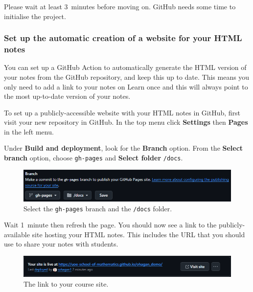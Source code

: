 Please wait at least 3~minutes before moving on. GitHub needs some time to initialise the project.

\subsubsection{Set up the automatic creation of a website for your HTML notes}

You can set up a GitHub Action to automatically generate the HTML version of your notes from the GitHub repository, and keep this up to date. This means you only need to add a link to your notes on Learn once and this will always point to the most up-to-date version of your notes.

To set up a publicly-accessible website with your HTML notes in GitHub, first visit your new repository in GitHub. In the top menu click \textbf{Settings} then \textbf{Pages} in the left menu.

Under \textbf{Build and deployment}, look for the \textbf{Branch} option. From the \textbf{Select branch} option, choose \texttt{gh-pages} and \textbf{Select folder} \texttt{/docs}.

\begin{figure}[h]
    \centering
    \includegraphics[width=\columnwidth]{img/GitHub-Pages.png}
    \caption{Select the \texttt{gh-pages} branch and the \texttt{/docs} folder.}
    \label{fig:gh-pages}
\end{figure}

Wait 1~minute then refresh the page. You should now see a link to the publicly-available site hosting your HTML notes. This includes the URL that you should use to share your notes with students.

\begin{figure}[h]
    \centering
    \includegraphics[width=\columnwidth]{img/GitHub-site-link.png}
    \caption{The link to your course site.}
    \label{fig:gh-site-link}
\end{figure}



